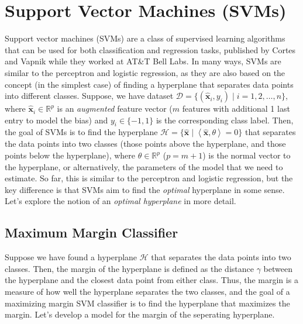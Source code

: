 \documentclass{article}[11pt]
\def\R{\mathbb{R}}
\begin{document}
\section{Support Vector Machines (SVMs)}\label{sec:svm}
Support vector machines (SVMs) are a class of supervised learning algorithms that can be used for both classification and regression tasks, 
published by Cortes and Vapnik \cite{Cortes:1995aa} while they worked at AT\&T Bell Labs.
In many ways, SVMs are similar to the perceptron and logistic regression, as they are also based on the concept (in the simplest case) of finding a hyperplane that separates data points into different classes.
Suppose, we have dataset $\mathcal{D} = \{(\hat{\mathbf{x}}_{i}, y_{i}) \mid i = 1,2,\dots,n\}$, where $\hat{\mathbf{x}}_i \in \R^p$ is an \textit{augmented} feature vector ($m$ features with additional 1 last entry to model the bias) and $y_i \in \{-1, 1\}$ is the corresponding class label.
Then, the goal of SVMs is to find the hyperplane $\mathcal{H} = \{\hat{\mathbf{x}} \mid \left<\hat{\mathbf{x}},\theta\right> = 0\}$ that separates the data points into two classes (those points above the hyperplane, and those points below the hyperplane), 
where $\theta \in \R^{p}$ ($p=m+1$) is the normal vector to the hyperplane, or alternatively, the parameters of the model that we need to estimate.
So far, this is similar to the perceptron and logistic regression, but the key difference is that SVMs aim to find the \textit{optimal} hyperplane in some sense. 
Let's explore the notion of an \textit{optimal hyperplane} in more detail.

\subsection{Maximum Margin Classifier}\label{sec:max-margin}
Suppose we have found a hyperplane $\mathcal{H}$ that separates the data points into two classes.
Then, the margin of the hyperplane is defined as the distance $\gamma$ between the hyperplane and the closest data point from either class.
Thus, the margin is a measure of how well the hyperplane separates the two classes, and the goal of a maximizing margin SVM classifier is to find the hyperplane that maximizes the margin.
Let's develop a model for the margin of the seperating hyperplane.
\end{document}
